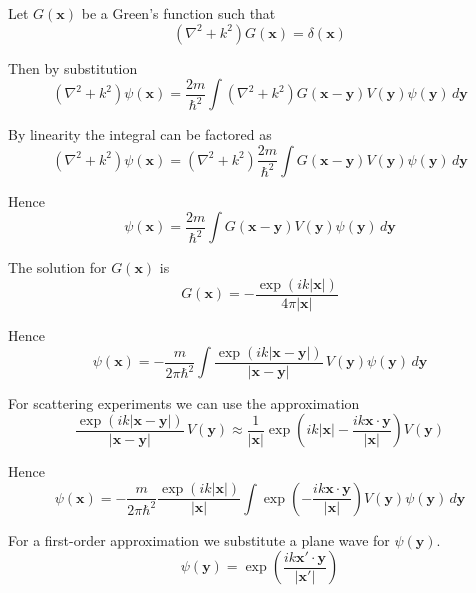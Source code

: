 Let $G(\mathbf x)$ be a Green's function such that
\begin{equation*}
\left(\nabla^2+k^2\right)G(\mathbf x)=\delta(\mathbf x)
\end{equation*}

Then by substitution
\begin{equation*}
\left(\nabla^2+k^2\right)\psi(\mathbf x)=\frac{2m}{\hbar^2}
\int\left(\nabla^2+k^2\right)G(\mathbf x-\mathbf y)V(\mathbf y)\psi(\mathbf y)\,d\mathbf y
\end{equation*}

By linearity the integral can be factored as
\begin{equation*}
\left(\nabla^2+k^2\right)\psi(\mathbf x)=\left(\nabla^2+k^2\right)\frac{2m}{\hbar^2}
\int G(\mathbf x-\mathbf y)V(\mathbf y)\psi(\mathbf y)\,d\mathbf y
\end{equation*}

Hence
\begin{equation*}
\psi(\mathbf x)=\frac{2m}{\hbar^2}
\int G(\mathbf x-\mathbf y)V(\mathbf y)\psi(\mathbf y)\,d\mathbf y
\end{equation*}

The solution for $G(\mathbf x)$ is
\begin{equation*}
G(\mathbf x)=-\frac{\exp(ik|\mathbf x|)}{4\pi|\mathbf x|}
\end{equation*}

Hence
\begin{equation*}
\psi(\mathbf x)=-\frac{m}{2\pi\hbar^2}
\int\frac{\exp(ik|\mathbf x-\mathbf y|)}{|\mathbf x-\mathbf y|}\,V(\mathbf y)\psi(\mathbf y)\,d\mathbf y
\end{equation*}

For scattering experiments we can use the approximation
\begin{equation*}
\frac{\exp(ik|\mathbf x-\mathbf y|)}{|\mathbf x-\mathbf y|}\,V(\mathbf y)
\approx\frac{1}{|\mathbf x|}
\exp\left(ik|\mathbf x|-\frac{ik\mathbf x\cdot\mathbf y}{|\mathbf x|}\right)V(\mathbf y)
\end{equation*}

Hence
\begin{equation*}
\psi(\mathbf x)=-\frac{m}{2\pi\hbar^2}\frac{\exp(ik|\mathbf x|)}{|\mathbf x|}
\int\exp\left(-\frac{ik\mathbf x\cdot\mathbf y}{|\mathbf x|}\right)
V(\mathbf y)\psi(\mathbf y)\,d\mathbf y
\end{equation*}

For a first-order approximation we substitute a plane wave for $\psi(\mathbf y)$.
\begin{equation*}
\psi(\mathbf y)=\exp\left(\frac{ik\mathbf x'\cdot\mathbf y}{|\mathbf x'|}\right)
\end{equation*}


